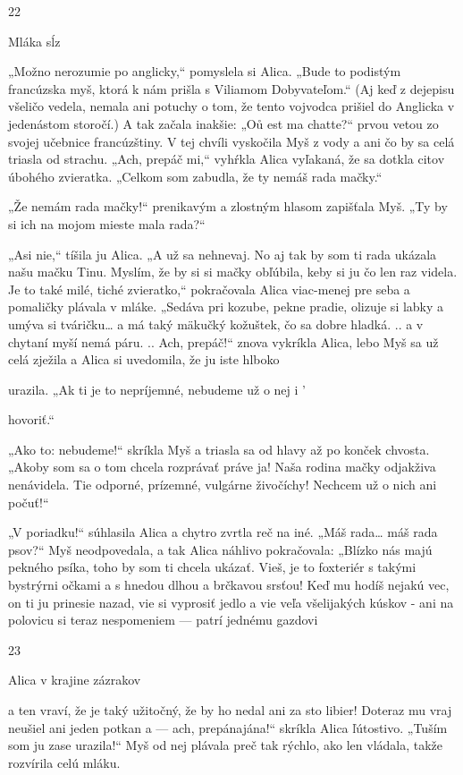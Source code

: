 \documentclass[12pt]{book}
\begin{document}
\begin{Parallel}[p]{}{}
{22

Mláka sĺz

„Možno nerozumie po anglicky,“ pomyslela si Alica.
„Bude to podistým francúzska myš, ktorá k nám prišla
s Viliamom Dobyvateľom.“ (Aj keď z dejepisu všeličo
vedela, nemala ani potuchy o tom, že tento vojvodca prišiel
do Anglicka v jedenástom storočí.) A tak začala inakšie:
„Oů est ma chatte?“ prvou vetou zo svojej učebnice
francúzštiny. V tej chvíli vyskočila Myš z vody a ani čo by sa
celá triasla od strachu. „Ach, prepáč mi,“ vyhŕkla Alica
vyľakaná, že sa dotkla citov úbohého zvieratka. „Celkom
som zabudla, že ty nemáš rada mačky.“

„Že nemám rada mačky!“ prenikavým a zlostným hlasom
zapišťala Myš. „Ty by si ich na mojom mieste mala rada?“

„Asi nie,“ tíšila ju Alica. „A už sa nehnevaj. No aj tak by
som ti rada ukázala našu mačku Tinu. Myslím, že by si si
mačky obľúbila, keby si ju čo len raz videla. Je to také milé,
tiché zvieratko,“ pokračovala Alica viac-menej pre seba
a pomaličky plávala v mláke. „Sedáva pri kozube, pekne
pradie, olizuje si labky a umýva si tváričku… a má taký
mäkučký kožuštek, čo sa dobre hladká. .. a v chytaní myší
nemá páru. .. Ach, prepáč!“ znova vykríkla Alica, lebo Myš
sa už celá zježila a Alica si uvedomila, že ju iste hlboko

urazila. „Ak ti je to nepríjemné, nebudeme už o nej   i '

hovoriť.“

„Ako to: nebudeme!“ skríkla Myš a triasla sa od hlavy až
po konček chvosta. „Akoby som sa o tom chcela rozprávať
práve ja! Naša rodina mačky odjakživa nenávidela. Tie
odporné, prízemné, vulgárne živočíchy! Nechcem už o nich
ani počuť!“

„V poriadku!“ súhlasila Alica a chytro zvrtla reč na iné.
„Máš rada… máš rada psov?“ Myš neodpovedala, a tak
Alica náhlivo pokračovala: „Blízko nás majú pekného
psíka, toho by som ti chcela ukázať. Vieš, je to foxteriér
s takými bystrýrni očkami a s hnedou dlhou a brčkavou
srsťou! Keď mu hodíš nejakú vec, on ti ju prinesie nazad, vie
si vyprosiť jedlo a vie veľa všelijakých kúskov - ani na
polovicu si teraz nespomeniem — patrí jednému gazdovi

23

 

 

Alica v krajine zázrakov

a ten vraví, že je taký užitočný, že by ho nedal ani za sto
libier! Doteraz mu vraj neušiel ani jeden potkan a — ach,
prepánajána!“ skríkla Alica ľútostivo. „Tuším som ju zase
urazila!“ Myš od nej plávala preč tak rýchlo, ako len vládala,
takže rozvírila celú mláku.

}
\end{Parallel}
\end{document}
